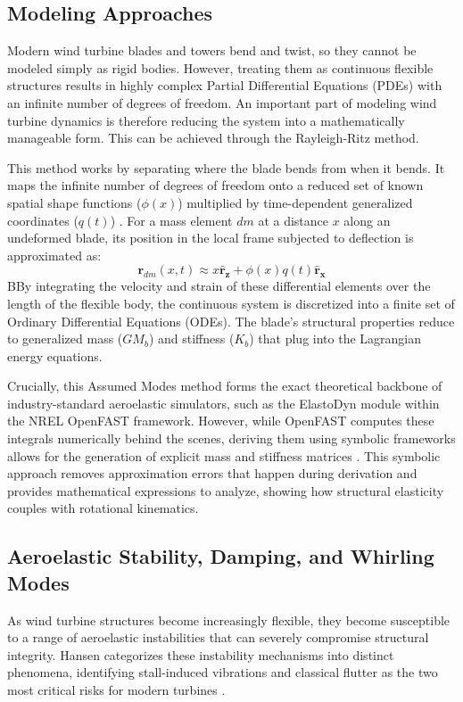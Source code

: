 \documentclass[onecolumn,draftcls]{IEEEtran}
\begin{document}
\subsection{Modeling Approaches}
Modern wind turbine blades and towers bend and twist, so they cannot be modeled simply as rigid bodies. However, treating them as continuous flexible structures results in highly complex Partial Differential Equations (PDEs) with an infinite number of degrees of freedom. An important part of modeling wind turbine dynamics is therefore reducing the system into a mathematically manageable form. This can be achieved through the Rayleigh-Ritz method.

This method works by separating where the blade bends from when it bends. It maps the infinite number of degrees of freedom onto a reduced set of known spatial shape functions ($\phi(x)$) multiplied by time-dependent generalized coordinates ($q(t)$) \cite{branlard2019flexible}. For a mass element $dm$ at a distance $x$ along an undeformed blade, its position in the local frame subjected to deflection is approximated as:
\begin{equation}
    \mathbf{r}_{dm}(x,t) \approx x \mathbf{\hat{r}_z} + \phi(x) q(t) \mathbf{\hat{r}_x}
\end{equation}
BBy integrating the velocity and strain of these differential elements over the length of the flexible body, the continuous system is discretized into a finite set of Ordinary Differential Equations (ODEs). The blade's structural properties reduce to generalized mass ($GM_b$) and stiffness ($K_b$) that plug into the Lagrangian energy equations.

Crucially, this Assumed Modes method forms the exact theoretical backbone of industry-standard aeroelastic simulators, such as the ElastoDyn module within the NREL OpenFAST framework. However, while OpenFAST computes these integrals numerically behind the scenes, deriving them using symbolic frameworks allows for the generation of explicit mass and stiffness matrices \cite{branlard2022symbolic}. This symbolic approach removes approximation errors that happen during derivation and provides mathematical expressions to analyze, showing  how structural elasticity couples with rotational kinematics.

\subsection{Aeroelastic Stability, Damping, and Whirling Modes}
As wind turbine structures become increasingly flexible, they become susceptible to a range of aeroelastic instabilities that can severely compromise structural integrity. Hansen categorizes these instability mechanisms into distinct phenomena, identifying stall-induced vibrations and classical flutter as the two most critical risks for modern turbines \cite{hansen2007aeroelastic}.
\end{document}
